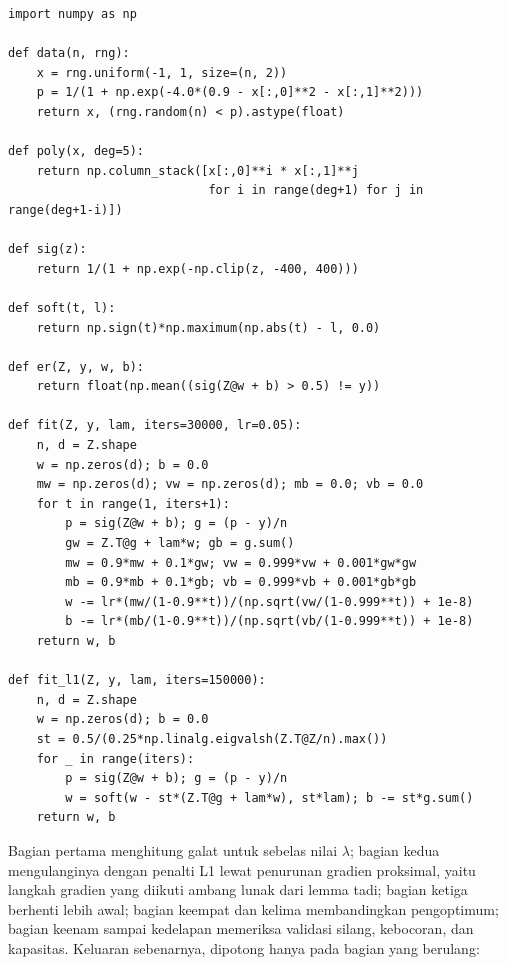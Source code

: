 \begin{lab}
\begin{verbatim}
import numpy as np

def data(n, rng):
    x = rng.uniform(-1, 1, size=(n, 2))
    p = 1/(1 + np.exp(-4.0*(0.9 - x[:,0]**2 - x[:,1]**2)))
    return x, (rng.random(n) < p).astype(float)

def poly(x, deg=5):
    return np.column_stack([x[:,0]**i * x[:,1]**j
                            for i in range(deg+1) for j in range(deg+1-i)])

def sig(z):
    return 1/(1 + np.exp(-np.clip(z, -400, 400)))

def soft(t, l):
    return np.sign(t)*np.maximum(np.abs(t) - l, 0.0)

def er(Z, y, w, b):
    return float(np.mean((sig(Z@w + b) > 0.5) != y))

def fit(Z, y, lam, iters=30000, lr=0.05):
    n, d = Z.shape
    w = np.zeros(d); b = 0.0
    mw = np.zeros(d); vw = np.zeros(d); mb = 0.0; vb = 0.0
    for t in range(1, iters+1):
        p = sig(Z@w + b); g = (p - y)/n
        gw = Z.T@g + lam*w; gb = g.sum()
        mw = 0.9*mw + 0.1*gw; vw = 0.999*vw + 0.001*gw*gw
        mb = 0.9*mb + 0.1*gb; vb = 0.999*vb + 0.001*gb*gb
        w -= lr*(mw/(1-0.9**t))/(np.sqrt(vw/(1-0.999**t)) + 1e-8)
        b -= lr*(mb/(1-0.9**t))/(np.sqrt(vb/(1-0.999**t)) + 1e-8)
    return w, b

def fit_l1(Z, y, lam, iters=150000):
    n, d = Z.shape
    w = np.zeros(d); b = 0.0
    st = 0.5/(0.25*np.linalg.eigvalsh(Z.T@Z/n).max())
    for _ in range(iters):
        p = sig(Z@w + b); g = (p - y)/n
        w = soft(w - st*(Z.T@g + lam*w), st*lam); b -= st*g.sum()
    return w, b
\end{verbatim}
\end{lab}

Bagian pertama menghitung galat untuk sebelas nilai $\lambda$; bagian kedua mengulanginya
dengan penalti L1 lewat penurunan gradien proksimal, yaitu langkah gradien yang diikuti
ambang lunak dari lemma tadi; bagian ketiga berhenti lebih awal; bagian keempat dan
kelima membandingkan pengoptimum; bagian keenam sampai kedelapan memeriksa validasi
silang, kebocoran, dan kapasitas. Keluaran sebenarnya, dipotong hanya pada bagian yang
berulang:

